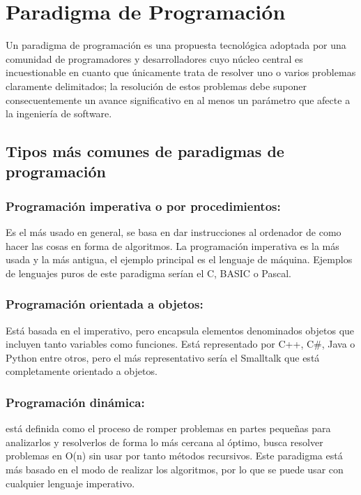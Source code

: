 \documentclass[11pt]{article}
\begin{document}
\section*{Paradigma de Programación}
\label{sec:org3aa0ca3}

Un paradigma de programación es una propuesta tecnológica adoptada por
una comunidad de programadores y desarrolladores cuyo núcleo central
es incuestionable en cuanto que únicamente trata de resolver uno o
varios problemas claramente delimitados; la resolución de estos
problemas debe suponer consecuentemente un avance significativo en al
menos un parámetro que afecte a la ingeniería de software.


\subsection*{Tipos más comunes de paradigmas de programación}
\label{sec:org14b2bce}

\subsubsection*{Programación imperativa o por procedimientos:}
\label{sec:org6a7a66b}
 Es el más usado en general, se basa en dar instrucciones al
ordenador de como hacer las cosas en forma de algoritmos. La
programación imperativa es la más usada y la más antigua, el
ejemplo principal es el lenguaje de máquina. Ejemplos de lenguajes
puros de este paradigma serían el C, BASIC o Pascal.

\subsubsection*{Programación orientada a objetos:}
\label{sec:org3138b89}
Está basada en el imperativo, pero encapsula elementos denominados
objetos que incluyen tanto variables como funciones. Está
representado por C++, C\#, Java o Python entre otros, pero el más
representativo sería el Smalltalk que está completamente orientado a
objetos.


\subsubsection*{Programación dinámica:}
\label{sec:org61208de}
 está definida como el proceso de romper
problemas en partes pequeñas para analizarlos y resolverlos de forma
lo más cercana al óptimo, busca resolver problemas en O(n) sin usar
por tanto métodos recursivos. Este paradigma está más basado en el
modo de realizar los algoritmos, por lo que se puede usar con
cualquier lenguaje imperativo.
\end{document}
